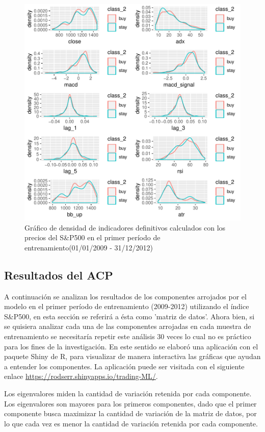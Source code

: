 \documentclass[a4paper,12pt]{Latex/Classes/PhDthesisPSnPDF}
\begin{document}
\begin{figure}[H]
\centering
\includegraphics{main-011}
\caption{Gráfico de densidad de indicadores definitivos calculados con los precios del S\&P500 en el primer período de entrenamiento(01/01/2009 - 31/12/2012)}
\end{figure}

\subsection{Resultados del ACP}

A continuación se analizan los resultados de los componentes arrojados por el modelo en el primer período de entrenamiento (2009-2012) utilizando el índice S\&P500, en esta sección se referirá a ésta como 'matriz de datos'. Ahora bien, si se quisiera analizar cada una de las componentes arrojadas en cada muestra de entrenamiento se necesitaría repetir este análisis 30 veces lo cual no es práctico para los fines de la investigación. En este sentido se elaboró una aplicación con el paquete Shiny de R, para visualizar de manera interactiva las gráficas que ayudan a entender los componentes. La aplicación puede ser visitada con el siguiente enlace \url{https://rodserr.shinyapps.io/trading-ML/}.


Los eigenvalores miden la cantidad de variación retenida por cada componente. Los eigenvalores son mayores para los primeros componentes, dado que el primer componente busca maximizar la cantidad de variación de la matriz de datos, por lo que cada vez es menor la cantidad de variación retenida por cada componente.
\end{document}
